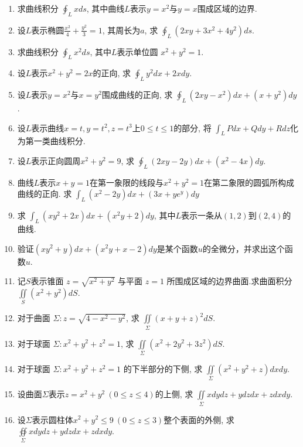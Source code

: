 \begin{enumerate}
	\item 求曲线积分 $\oint_L xds$, 其中曲线$L$表示$y=x^2$与$y=x$围成区域的边界.
	
	
	
	\item 设$L$表示椭圆$\frac{x^2}{4}+\frac{y^2}{3}=1$, 其周长为$a$, 求 $\oint_L (2xy+3x^2+4y^2) ds$.
	\item 求曲线积分 $\oint_L x^2 ds$, 其中$L$表示单位圆 $x^2 + y^2 = 1$.
	\item 设$L$表示$x^2 + y^2 = 2x$的正向, 求 $\oint_L y^2 dx + 2xdy$.
	\item 设$L$表示$y=x^2$与$x=y^2$围成曲线的正向, 求 $\oint_L (2xy-x^2)dx+(x+y^2)dy$.
	
	\item 设$L$表示曲线$x = t, y = t^2, z = t^3$上$0 \leq t \leq 1$的部分, 将 $\int_L Pdx+Qdy+Rdz$化为第一类曲线积分.
	
	\item 设$L$表示正向圆周$x^2+y^2=9$, 求 $\oint_L (2xy-2y)dx+(x^2-4x)dy$.
	
	\item 曲线$L$表示$x+y=1$在第一象限的线段与$x^2+y^2=1$在第二象限的圆弧所构成曲线的正向.
	求 $\int_L (x^2-2y)dx+(3x+ye^y)dy$
	
	\item 求 $\int_L (xy^2+2x)dx+(x^2y+2)dy$, 其中$L$表示一条从$(1,2)$到$(2,4)$的曲线.
	
	
	\item 验证$(xy^2+y)dx+(x^2y+x-2)dy$是某个函数$u$的全微分，并求出这个函数$u$.
	
	\item 记$S$表示锥面 $z=\sqrt{x^2+y^2}$ 与平面 $z=1$ 所围成区域的边界曲面.求曲面积分 $\iint\limits_S (x^2+y^2)dS$.
	
	\item 对于曲面 $\Sigma: z=\sqrt{4-x^2-y^2}$, 求 $\iint\limits_{\Sigma} (x+y+z)^2 dS$.

	\item 对于球面 $\Sigma: x^2+y^2+z^2=1$, 求 $\iint\limits_{\Sigma} (x^2+2y^2+3z^2)dS$.

	\item 对于球面 $\Sigma: x^2+y^2+z^2=1$ 的下半部分的下侧, 求 $\iint\limits_{\Sigma} (x^2+y^2+z)dxdy$.
	
	\item 设曲面$\Sigma$表示$z = x^2 + y^2 \ (0 \leq z \leq 4)$的上侧, 求 $\iint\limits_{\Sigma} xdydz + ydzdx + zdxdy$.
	
	\item 设$\Sigma$表示圆柱体$x^2+y^2 \leq 9 \ (0 \leq z \leq 3)$整个表面的外侧, 求 $\oiint\limits_{\Sigma} xdydz + ydzdx + zdxdy$.


\end{enumerate}
